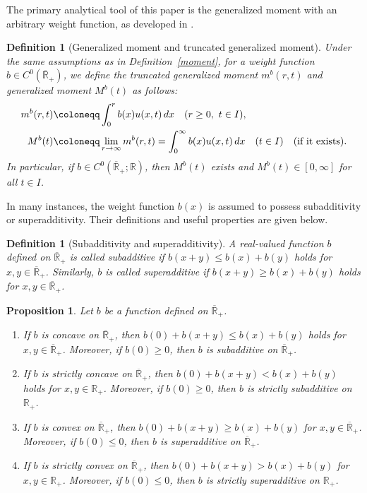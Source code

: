 \documentclass[a4paper,11pt]{article}
\newtheorem{prop}[thm]{Proposition}
\newtheorem{dfn}[thm]{Definition}
\def\R{{\mathbb R}}
\def\Rp{{\mathbb R}_+}
\def\Rb{\overline{{\mathbb R}}_+}
\begin{document}
The primary analytical tool of this paper is the generalized moment with an arbitrary weight function, as developed in \cite{I-K-M2023}.

\begin{dfn}[Generalized moment and truncated generalized moment]\label{gmoment}
Under the same assumptions as in Definition~\ref{moment},
for a weight function $b\in C^0(\Rb)$, we define the truncated generalized moment $m^b(r,t)$ and generalized moment $M^b(t)$ as follows:
\begin{align}
m^b(r,t)&\coloneqq \int^r_0 b(x) u(x,t)\,dx \quad(r\geq 0,\ t\in I),\label{mbr}\\
M^b(t)&\coloneqq  \lim_{r\to \infty} m^b(r,t)=\int^\infty_0 b(x) u(x,t)\,dx
\quad(t\in I)\quad\text{(if it exists)}.\notag
\end{align}
In particular, if $b\in C^0(\Rb;\R)$, then $M^b(t)$ exists and $M^b(t)\in [0,\infty]$ for all $t\in I$.
\end{dfn}

In many instances, the weight function $b(x)$ is assumed to possess subadditivity or superadditivity. Their definitions and useful properties are given below.

\begin{dfn}[Subadditivity and superadditivity]
A real-valued function $b$ defined on $\Rb$ is called \emph{subadditive} if
$b(x+y)\leq b(x)+b(y)$ holds for $x,y\in\Rb$.
Similarly, $b$ is called \emph{superadditive} if $b(x+y)\geq b(x)+b(y)$ holds for $x,y\in\Rb$.
\end{dfn}

\begin{prop}\label{additive}
Let $b$ be a function defined on $\Rb$.
\begin{enumerate}[(1)]
\item
If $b$ is concave on $\Rb$, then
$b(0)+b(x+y)\le b(x)+b(y)$ holds for $x,y\in\Rb$.
Moreover, if $b(0)\ge 0$, then $b$ is subadditive on $\Rb$.
\item
If $b$ is strictly concave on $\Rb$, then
$b(0)+b(x+y)< b(x)+b(y)$ holds for $x,y\in\Rp$.
Moreover, if $b(0)\ge 0$, then $b$ is strictly subadditive on $\Rp$.
\item
If $b$ is convex on $\Rb$, then
$b(0)+b(x+y)\ge b(x)+b(y)$ for $x,y\in\Rb$. Moreover, if $b(0)\le 0$, then $b$ is superadditive on $\Rb$.
\item
If $b$ is strictly convex on $\Rb$, then
$b(0)+b(x+y)> b(x)+b(y)$ for $x,y\in\Rp$.
Moreover, if $b(0)\le 0$, then $b$ is strictly superadditive on $\Rp$.
\end{enumerate}
\end{prop}
\end{document}
